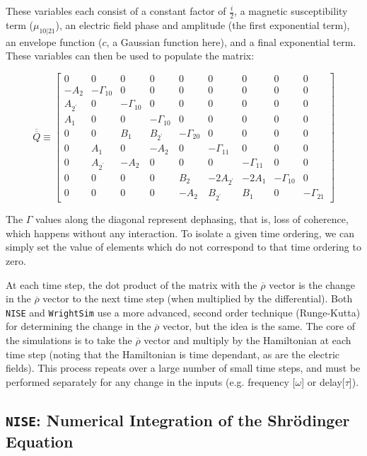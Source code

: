 \documentclass[fontsize=11pt]{scrartcl}
\numberwithin{equation}{section}		%
\numberwithin{figure}{section}			%
\numberwithin{table}{section}				%
\begin{document}
These variables each consist of a constant factor of $\frac{i}{2}$, a magnetic susceptibility term ($\mu_{10|21}$), an electric field phase and amplitude (the first exponential term), an envelope function ($c$, a Gaussian function here), and a final exponential term.
These variables can then be used to populate the matrix:

\begin{equation}
\overline{\overline{Q}} \equiv
\begin{bmatrix}
	0 & 0 & 0 & 0 & 0 & 0 & 0 & 0 & 0 \\
	-A_2 & -\Gamma_{10} & 0 & 0 & 0 & 0 & 0 & 0 & 0 \\
	A_{2^\prime} & 0 & -\Gamma_{10} & 0 & 0 & 0 & 0 & 0 & 0 \\
	A_1 & 0 & 0 & -\Gamma_{10} & 0 & 0 & 0 & 0 & 0 \\
	0 & 0 & B_1 & B_{2^\prime} & -\Gamma_{20} & 0 & 0 & 0 & 0 \\
	0 & A_1 & 0 & -A_2 & 0 & -\Gamma_{11} & 0 & 0 & 0 \\
	0 & A_{2^\prime} & -A_2 & 0 & 0 & 0 & -\Gamma_{11} & 0 & 0 \\
	0 & 0 & 0 & 0 & B_2 & -2A_{2^\prime} & -2A_1 & -\Gamma_{10} & 0 \\
	0 & 0 & 0 & 0 & -A_2 & B_{2^\prime} & B_1 & 0 & -\Gamma_{21}
\end{bmatrix}
\label{eq:single_Q}
\end{equation}

The $\Gamma$ values along the diagonal represent dephasing, that is, loss of coherence, which happens without any interaction.
To isolate a given time ordering, we can simply set the value of elements which do not correspond to that time ordering to zero.

At each time step, the dot product of the matrix with the $\overline{\rho}$ vector is the change in the $\overline{\rho}$ vector to the next time step (when multiplied by the differential).
Both \texttt{NISE} and \texttt{WrightSim} use a more advanced, second order technique (Runge-Kutta) for determining the change in the $\overline{\rho}$ vector, but the idea is the same.
The core of the simulations is to take the $\overline{\rho}$ vector and multiply by the Hamiltonian at each time step (noting that the Hamiltonian is time dependant, as are the electric fields).
This process repeats over a large number of small time steps, and must be performed separately for any change in the inputs (e.g. frequency [$\omega$] or delay[$\tau$]).


\subsection{\texttt{NISE}: Numerical Integration of the Shr{\"o}dinger Equation}
\end{document}
